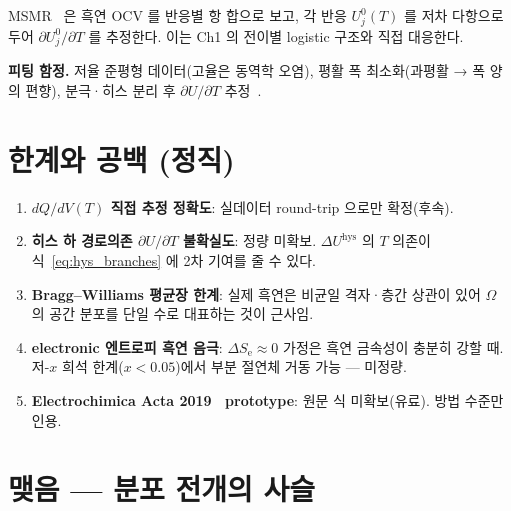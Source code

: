 \documentclass[11pt,a4paper]{article}
\newcommand{\elec}{\mathrm{e}}
\newcommand{\hys}{\mathrm{hys}}
\begin{document}
MSMR~\cite{msmr_partI,msmr_partII} 은 흑연 OCV 를 반응별 항 합으로 보고,
각 반응 $U_j^0(T)$ 를 저차 다항으로 두어 $\partial U_j^0/\partial T$ 를 추정한다.
이는 Ch1 의 전이별 logistic 구조와 직접 대응한다.

\textbf{피팅 함정.} 저율 준평형 데이터(고율은 동역학 오염), 평활 폭 최소화(과평활
→ 폭 양의 편향), 분극·히스 분리 후 $\partial U/\partial T$ 추정~\cite{msmr_partI,msmr_partII}.

\section{한계와 공백 (정직)}\label{sec:limit}

\begin{enumerate}[leftmargin=1.6em,itemsep=3pt]
\item \textbf{$dQ/dV(T)$ 직접 추정 정확도}: 실데이터 round-trip 으로만 확정(후속).
\item \textbf{히스 하 경로의존 $\partial U/\partial T$ 불확실도}: 정량 미확보.
  $\Delta U^\hys$ 의 $T$ 의존이 식~\eqref{eq:hys_branches} 에 2차 기여를 줄 수 있다.
\item \textbf{Bragg--Williams 평균장 한계}: 실제 흑연은 비균일 격자·층간 상관이 있어
  $\Omega$ 의 공간 분포를 단일 수로 대표하는 것이 근사임.
\item \textbf{electronic 엔트로피 흑연 음극}: $\Delta S_\elec\approx0$ 가정은
  흑연 금속성이 충분히 강할 때. 저-$x$ 희석 한계($x<0.05$)에서 부분 절연체 거동
  가능 --- 미정량.
\item \textbf{Electrochimica Acta 2019~\cite{occupation2019} prototype}: 원문 식 미확보(유료).
  방법 수준만 인용.
\end{enumerate}

\section*{맺음 — 분포 전개의 사슬}
\end{document}
